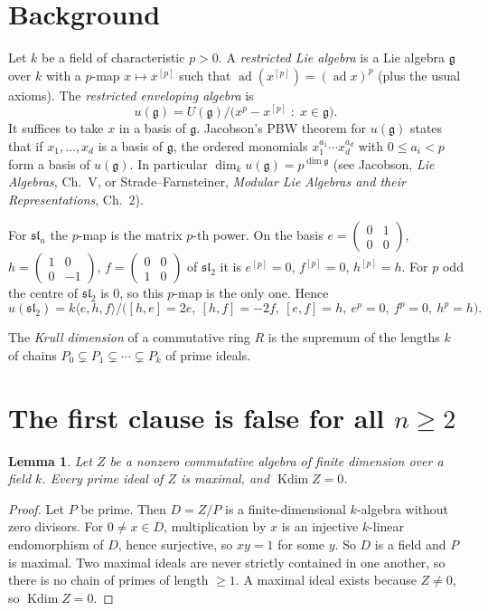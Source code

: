 \documentclass[11pt]{article}
\newtheorem{lemma}[theorem]{Lemma}
\theoremstyle{definition}
\theoremstyle{remark}
\newcommand{\slt}{\mathfrak{sl}_2}
\newcommand{\sln}{\mathfrak{sl}_n}
\newcommand{\g}{\mathfrak{g}}
\newcommand{\kdim}{\operatorname{Kdim}}
\begin{document}
\section{Background}

Let $k$ be a field of characteristic $p>0$. A \emph{restricted Lie algebra} is a Lie algebra $\g$
over $k$ with a $p$-map $x\mapsto x^{[p]}$ such that $\operatorname{ad}(x^{[p]})=(\operatorname{ad}x)^p$ (plus
the usual axioms). The \emph{restricted enveloping algebra} is
\[
u(\g)=U(\g)\big/\bigl(x^p-x^{[p]}\;:\;x\in\g\bigr).
\]
It suffices to take $x$ in a basis of $\g$. Jacobson's PBW theorem for $u(\g)$ states that if
$x_1,\dots,x_d$ is a basis of $\g$, the ordered monomials $x_1^{a_1}\cdots x_d^{a_d}$ with
$0\le a_i<p$ form a basis of $u(\g)$. In particular $\dim_k u(\g)=p^{\dim\g}$ (see Jacobson,
\emph{Lie Algebras}, Ch.~V, or Strade--Farnsteiner, \emph{Modular Lie Algebras and their
Representations}, Ch.~2).

For $\sln$ the $p$-map is the matrix $p$-th power. On the basis
$e=\begin{pmatrix}0&1\\0&0\end{pmatrix}$, $h=\begin{pmatrix}1&0\\0&-1\end{pmatrix}$,
$f=\begin{pmatrix}0&0\\1&0\end{pmatrix}$ of $\slt$ it is
$e^{[p]}=0$, $f^{[p]}=0$, $h^{[p]}=h$. For $p$ odd the centre of $\slt$ is $0$, so this $p$-map is
the only one. Hence
\[
u(\slt)=k\langle e,h,f\rangle\big/\bigl([h,e]=2e,\ [h,f]=-2f,\ [e,f]=h,\ e^p=0,\ f^p=0,\ h^p=h\bigr).
\]

The \emph{Krull dimension} of a commutative ring $R$ is the supremum of the lengths $k$ of
chains $P_0\subsetneq P_1\subsetneq\cdots\subsetneq P_k$ of prime ideals.

\section{The first clause is false for all \texorpdfstring{$n\ge 2$}{n >= 2}}

\begin{lemma}\label{lem:artin}
Let $Z$ be a nonzero commutative algebra of finite dimension over a field $k$. Every prime ideal
of $Z$ is maximal, and $\kdim Z=0$.
\end{lemma}
\begin{proof}
Let $P$ be prime. Then $D=Z/P$ is a finite-dimensional $k$-algebra without zero divisors. For
$0\neq x\in D$, multiplication by $x$ is an injective $k$-linear endomorphism of $D$, hence
surjective, so $xy=1$ for some $y$. So $D$ is a field and $P$ is maximal. Two maximal ideals are
never strictly contained in one another, so there is no chain of primes of length $\ge 1$. A
maximal ideal exists because $Z\neq 0$, so $\kdim Z=0$.
\end{proof}
\end{document}
